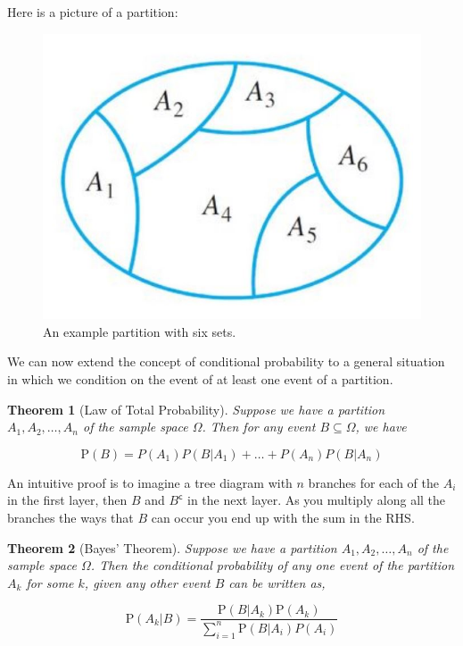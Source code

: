 \documentclass[
]{book}
\newtheorem{theorem}{Theorem}[chapter]
\theoremstyle{definition}
\theoremstyle{definition}
\theoremstyle{definition}
\theoremstyle{definition}
\theoremstyle{remark}
\begin{document}
Here is a picture of a partition:

\begin{figure}

{\centering \includegraphics[width=9.31in]{./figures/partition} 

}

\caption{An example partition with six sets.}\label{fig:partition}
\end{figure}

We can now extend the concept of conditional probability to a general situation in which we condition on the event of at least one event of a partition.

\begin{theorem}[Law of Total Probability]
Suppose we have a partition \(A_1, A_2, \dots , A_n\) of the sample space \(\Omega\). Then for any event \(B \subseteq \Omega\), we have

\[\text{P}(B) =P(A_1)P(B|A_1)+ \dots + P(A_n)P(B|A_n) \]
\end{theorem}

An intuitive proof is to imagine a tree diagram with \(n\) branches for each of the \(A_i\) in the first layer, then \(B\) and \(B^{\mathsf{c}}\) in the next layer. As you multiply along all the branches the ways that \(B\) can occur you end up with the sum in the RHS.

\begin{theorem}[Bayes' Theorem]
Suppose we have a partition \(A_1, A_2, \dots , A_n\) of the sample space \(\Omega\). Then the conditional probability of any one event of the partition \(A_k\) for some \(k\), given any other event \(B\) can be written as,

\[\text{P}(A_k |B) = \frac{\text{P}(B|A_k)\text{P}(A_k)}{\sum^{n}_{i=1}\text{P}(B|A_i)P(A_i)}\]
\end{theorem}
\end{document}
